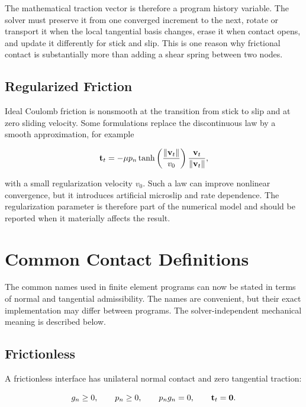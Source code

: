The mathematical traction vector is therefore a program history variable. The
solver must preserve it from one converged increment to the next, rotate or
transport it when the local tangential basis changes, erase it when contact
opens, and update it differently for stick and slip. This is one reason why
frictional contact is substantially more than adding a shear spring between two
nodes.

\subsection{Regularized Friction}

Ideal Coulomb friction is nonsmooth at the transition from stick to slip and at
zero sliding velocity. Some formulations replace the discontinuous law by a
smooth approximation, for example

\begin{equation}
    \mathbf{t}_t = -\mu p_n
    \tanh\left(\frac{\| {\mathbf{v}_t} \|}{v_0}\right)
    \frac{\mathbf{v}_t}{\| {\mathbf{v}_t} \|},
\end{equation}

with a small regularization velocity $ v_0 $. Such a law can improve nonlinear
convergence, but it introduces artificial microslip and rate dependence. The
regularization parameter is therefore part of the numerical model and should be
reported when it materially affects the result.

\section{Common Contact Definitions}

The common names used in finite element programs can now be stated in terms of
normal and tangential admissibility. The names are convenient, but their exact
implementation may differ between programs. The solver-independent mechanical
meaning is described below.

\subsection{Frictionless}

A frictionless interface has unilateral normal contact and zero tangential
traction:

\begin{equation}
    g_n \geq 0, \qquad p_n \geq 0, \qquad p_n g_n=0,
    \qquad \mathbf{t}_t=\mathbf{0}.
\end{equation}

